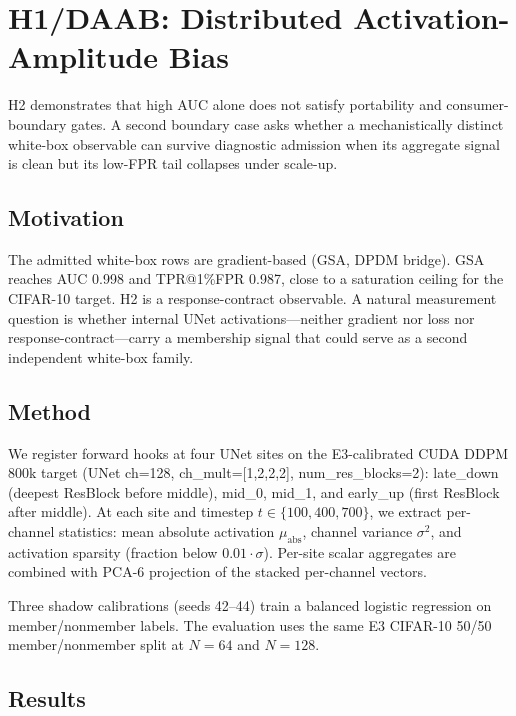\documentclass[10pt,conference]{IEEEtran}
\begin{document}
\section{H1/DAAB: Distributed Activation-Amplitude Bias}

H2 demonstrates that high AUC alone does not satisfy portability and
consumer-boundary gates. A second boundary case asks whether a mechanistically
distinct white-box observable can survive diagnostic admission when its aggregate
signal is clean but its low-FPR tail collapses under scale-up.

\subsection{Motivation}

The admitted white-box rows are gradient-based (GSA, DPDM bridge). GSA reaches
AUC 0.998 and TPR@1\%FPR 0.987, close to a saturation ceiling for the CIFAR-10
target. H2 is a response-contract observable. A natural measurement question is
whether internal UNet activations---neither gradient nor loss nor
response-contract---carry a membership signal that could serve as a second
independent white-box family.

\subsection{Method}

We register forward hooks at four UNet sites on the E3-calibrated CUDA DDPM
800k target (UNet ch=128, ch\_mult=[1,2,2,2], num\_res\_blocks=2):
late\_down (deepest ResBlock before middle), mid\_0, mid\_1, and early\_up
(first ResBlock after middle). At each site and timestep
$t \in \{100, 400, 700\}$, we extract per-channel statistics: mean absolute
activation $\mu_{\text{abs}}$, channel variance $\sigma^2$, and activation
sparsity (fraction below $0.01 \cdot \sigma$). Per-site scalar aggregates
are combined with PCA-6 projection of the stacked per-channel vectors.

Three shadow calibrations (seeds 42--44) train a balanced logistic regression
on member/nonmember labels. The evaluation uses the same E3 CIFAR-10 50/50
member/nonmember split at $N=64$ and $N=128$.

\subsection{Results}
\end{document}
